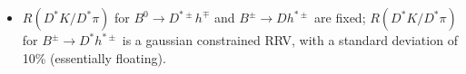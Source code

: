 \documentclass[12pt, landscape]{article}
\begin{document}
\begin{itemize}
    \begin{equation*}
      \colorbox{green!35}{\text{N($B^{\pm}\rightarrow (D^*\rightarrow
      D\pi^0(D\gamma))\rho^{\pm}$)}} =
      \colorbox{green!35}{\text{N($B^{\pm}\rightarrow (D^*\rightarrow
      D\gamma(\pi^0))\rho^{\pm}$)}} \times 
      \colorbox{pink}{$\frac{BF(D^*\rightarrow
      D\pi^0(D\gamma))}{BF(D^*\rightarrow D\gamma(\pi^0))}$} \times
      \colorbox{pink}{$\frac{\epsilon_{sel}(B^{\pm}\rightarrow (D^*\rightarrow
      D\pi^0(D\gamma))\rho^{\pm})}{\epsilon_{sel}(B^{\pm}\rightarrow
      (D^*\rightarrow D\gamma(\pi^0))\rho^{\pm})}$}
    \end{equation*}
    Again, the central values of the gaussians are the result of the
    calculations, and the standard deviations are the combined error of the
    selection efficiencies and branching fractions.
  \item $R(D^*K/D^*\pi)$ for $B^0\rightarrow D^{*\pm}h^{\mp}$ and
    $B^{\pm}\rightarrow Dh^{*\pm}$ are fixed; $R(D^*K/D^*\pi)$ for
    $B^{\pm}\rightarrow D^*h^{*\pm}$ is a gaussian constrained RRV, with a
    standard deviation of 10\% (essentially floating).
\end{itemize}
\end{document}
